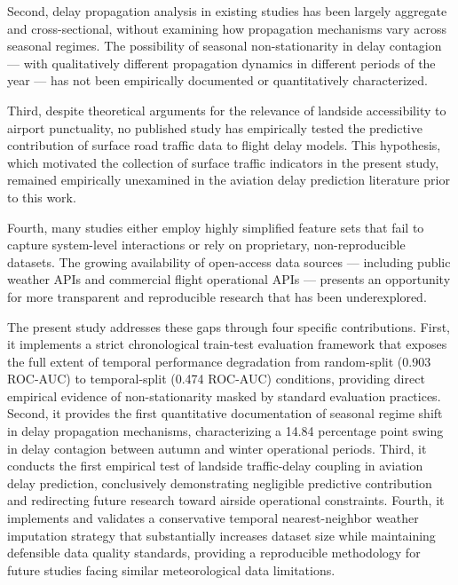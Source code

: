 \documentclass{report}
\begin{document}
Second, delay propagation analysis in existing studies has been largely aggregate and cross-sectional, without examining how propagation mechanisms vary across seasonal regimes. The possibility of seasonal non-stationarity in delay contagion --- with qualitatively different propagation dynamics in different periods of the year --- has not been empirically documented or quantitatively characterized.

Third, despite theoretical arguments for the relevance of landside accessibility to airport punctuality, no published study has empirically tested the predictive contribution of surface road traffic data to flight delay models. This hypothesis, which motivated the collection of surface traffic indicators in the present study, remained empirically unexamined in the aviation delay prediction literature prior to this work.

Fourth, many studies either employ highly simplified feature sets that fail to capture system-level interactions or rely on proprietary, non-reproducible datasets. The growing availability of open-access data sources --- including public weather APIs and commercial flight operational APIs --- presents an opportunity for more transparent and reproducible research that has been underexplored.

The present study addresses these gaps through four specific contributions. First, it implements a strict chronological train-test evaluation framework that exposes the full extent of temporal performance degradation from random-split (0.903 ROC-AUC) to temporal-split (0.474 ROC-AUC) conditions, providing direct empirical evidence of non-stationarity masked by standard evaluation practices. Second, it provides the first quantitative documentation of seasonal regime shift in delay propagation mechanisms, characterizing a 14.84 percentage point swing in delay contagion between autumn and winter operational periods. Third, it conducts the first empirical test of landside traffic-delay coupling in aviation delay prediction, conclusively demonstrating negligible predictive contribution and redirecting future research toward airside operational constraints. Fourth, it implements and validates a conservative temporal nearest-neighbor weather imputation strategy that substantially increases dataset size while maintaining defensible data quality standards, providing a reproducible methodology for future studies facing similar meteorological data limitations.
\end{document}
